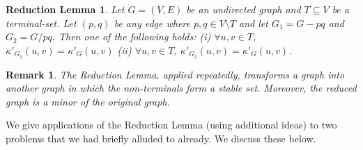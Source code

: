 \documentclass[11pt]{article}
\newtheorem{remark}[lemma]{Remark}
\newtheorem*{redlem}{Reduction Lemma}
\newcommand{\elconn}{\kappa'}
\begin{document}
\begin{redlem} \label{lem:reduction}
  Let $G=(V,E)$ be an undirected graph and $T \subseteq V$ be a terminal-set.
  Let $(p,q)$ be {\em any} edge where $p,q \in V \setminus T$ and
  let $G_1 = G - pq$ and $G_2 = G/pq$. Then one of the following holds:
  (i) $\forall u,v \in T$, $\elconn_{G_1}(u,v) = \elconn_{G}(u,v)$ 
  (ii) $\forall u,v \in T$, $\elconn_{G_2}(u,v) = \elconn_{G}(u,v)$.
\end{redlem}

\begin{remark}
  The Reduction Lemma, applied repeatedly, transforms a graph
  into another graph in which the non-terminals form a stable set. Moreover,
  the reduced graph is a minor of the original graph.
\end{remark}

We give applications of the Reduction Lemma (using additional ideas)
to two problems that we had briefly alluded to already. We discuss
these below.
\end{document}
